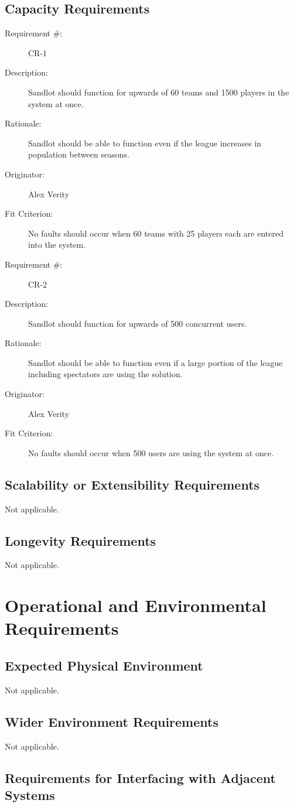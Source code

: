 \documentclass[12pt]{article}
\newenvironment{myreq}[1]{%
\setlist[description]{font=\normalfont\color{darkgray}}%
\begin{tcolorbox}[colframe=black,colback=white, sharp corners, boxrule=1pt]%
\bfseries\color{blue}%
\begin{description}#1}%
{\end{description}\end{tcolorbox}}
\newcommand{\twoinline}[2]{\begin{multicols}{2}#1 #2\end{multicols}}
\newcommand{\reqno}{\item[Requirement \#:]}
\newcommand{\reqdesc}{\item[Description:]}
\newcommand{\reqrat}{\item[Rationale:]}
\newcommand{\reqorig}{\item[Originator:]}
\newcommand{\reqfit}{\item[Fit Criterion:]}
\newcommand{\reqsatis}{\item[Customer Satisfaction:]}
\newcommand{\reqdissat}{\item[Customer Dissatisfaction:]}
\begin{document}
\subsection{Capacity Requirements}

\begin{myreq}
  \reqno CR-1
  \reqdesc Sandlot should function for upwards of 60 teams and 1500 players in
  the system at once.
  \reqrat Sandlot should be able to function even if the league increases in
  population between seasons.
  \reqorig Alex Verity
  \reqfit No faults should occur when 60 teams with 25 players each are
  entered into the system.
  \twoinline
    {\reqsatis 2}
    {\reqdissat 2}
\end{myreq}

\begin{myreq}
  \reqno CR-2
  \reqdesc Sandlot should function for upwards of 500 concurrent users.
  \reqrat Sandlot should be able to function even if a large portion of the
  league including spectators are using the solution.
  \reqorig Alex Verity
  \reqfit No faults should occur when 500 users are using the system at once.
  \twoinline
    {\reqsatis 3}
    {\reqdissat 3}
\end{myreq}

\subsection{Scalability or Extensibility Requirements}
Not applicable.
\subsection{Longevity Requirements}
Not applicable.

\section{Operational and Environmental Requirements}
\subsection{Expected Physical Environment}
Not applicable.
\subsection{Wider Environment Requirements}
Not applicable.
\subsection{Requirements for Interfacing with Adjacent Systems}
\end{document}
